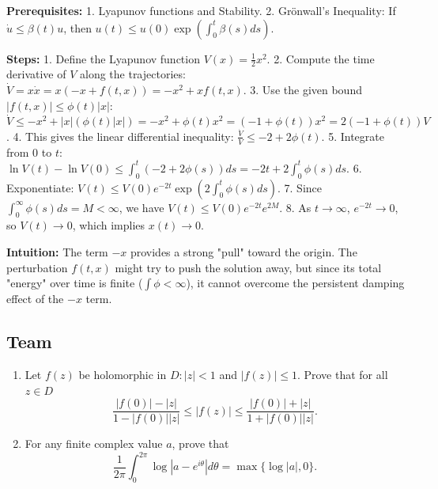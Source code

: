 \begin{solution}
\textbf{Prerequisites:}
1. Lyapunov functions and Stability.
2. Gr\"onwall's Inequality: If $\dot{u} \leq \beta(t) u$, then $u(t) \leq u(0) \exp(\int_0^t \beta(s) ds)$.

\textbf{Steps:}
1. Define the Lyapunov function $V(x) = \frac{1}{2} x^2$.
2. Compute the time derivative of $V$ along the trajectories:
$\dot{V} = x \dot{x} = x(-x + f(t, x)) = -x^2 + x f(t, x)$.
3. Use the given bound $|f(t, x)| \leq \phi(t)|x|$:
$\dot{V} \leq -x^2 + |x|(\phi(t)|x|) = -x^2 + \phi(t)x^2 = (-1 + \phi(t))x^2 = 2(-1 + \phi(t))V$.
4. This gives the linear differential inequality: $\frac{\dot{V}}{V} \leq -2 + 2\phi(t)$.
5. Integrate from $0$ to $t$:
$\ln V(t) - \ln V(0) \leq \int_0^t (-2 + 2\phi(s)) ds = -2t + 2\int_0^t \phi(s) ds$.
6. Exponentiate:
$V(t) \leq V(0) e^{-2t} \exp\left( 2\int_0^t \phi(s) ds \right)$.
7. Since $\int_0^\infty \phi(s) ds = M < \infty$, we have $V(t) \leq V(0) e^{-2t} e^{2M}$.
8. As $t \to \infty$, $e^{-2t} \to 0$, so $V(t) \to 0$, which implies $x(t) \to 0$.

\textbf{Intuition:}
The term $-x$ provides a strong "pull" toward the origin. The perturbation $f(t, x)$ might try to push the solution away, but since its total "energy" over time is finite ($\int \phi < \infty$), it cannot overcome the persistent damping effect of the $-x$ term.
\end{solution}

\subsection{Team}

\begin{exercise}
\label{analysis:2010:7}
\begin{enumerate}
    \item Let $f(z)$ be holomorphic in $D: |z| < 1$ and $|f(z)| \leq 1$. Prove that for all $z \in D$
    \[
    \frac{|f(0)| - |z|}{1 - |f(0)||z|} \leq |f(z)| \leq \frac{|f(0)| + |z|}{1 + |f(0)||z|}.
    \]
    \item For any finite complex value $a$, prove that
    \[
    \frac{1}{2\pi} \int_0^{2\pi} \log |a - e^{i\theta}| d\theta = \max\{\log |a|, 0\}.
    \]
\end{enumerate}
\end{exercise}

